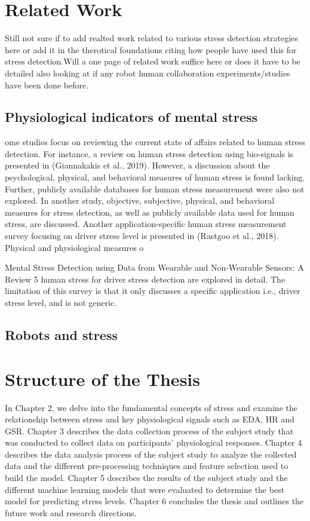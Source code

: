 \section{Related Work}
Still not sure if to add realted work related to various  stress detection strategies here or add it in the therotical foundations citing how people have used this for stress detection.Will a one page of related work suffice here or does  it have to be detailed also looking at if any robot human collaboration experiments/studies have been done before.
\subsection*{Physiological indicators of mental stress}
ome studies focus on reviewing the current state of affairs related to human stress detection. For instance, a review on human stress detection using bio-signals is presented in (Giannakakis et al., 2019). However, a discussion about the psychological, physical, and behavioral measures of human stress is found lacking. Further, publicly available databases for human stress measurement were also not explored. In another study, objective, subjective, physical, and behavioral measures for stress detection, as well as publicly available data used for human stress, are discussed. Another application-specific human stress measurement survey focusing on driver stress level is presented in (Rastgoo et al., 2018). Physical and physiological measures o

Mental Stress Detection using Data from Wearable and Non-Wearable Sensors: A Review 5 human stress for driver stress detection are explored in detail. The limitation of this survey is that it only discusses a specific application i.e., driver stress level, and is not generic.

\subsection*{Robots and stress}



\section{Structure of the Thesis}
  In Chapter 2, we delve into the fundamental concepts of stress and examine the relationship between stress and key physiological signals such as \gls{EDA}, \gls{HR} and \gls{GSR}. Chapter 3 describes the data collection process of the subject study that was conducted to collect data on participants' physiological responses. Chapter 4 describes the data analysis process of the subject study  to analyze the collected data and the different pre-processing techniques and feature selection used to build the model. Chapter 5 describes the results of the subject study and the different machine learning models that were evaluated to determine the best model for predicting stress levels. Chapter 6 concludes the thesis and outlines the future work and research directions.
  

  
 
 